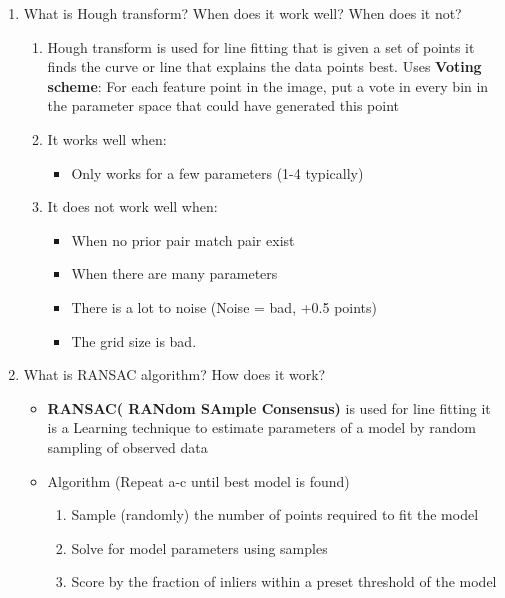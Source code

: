 \documentclass[12pt,letterpaper]{article}
\begin{document}
\begin{enumerate}
\begin{enumerate}
    \end{enumerate}
    \color{black}
    \item What is Hough transform? When does it work well? When does it not?\\
    \color{red}
    \begin{enumerate}
        \item Hough transform is used for line fitting that is given a set of points it finds the curve or line that explains the data points best. Uses \textbf{Voting scheme}: For each feature point in the image, put a vote in every bin in the parameter space that could have generated this point
        \item It works well when: 
        \begin{itemize}
            \item Only works for a few parameters (1-4 typically)
        \end{itemize}
        \item It does not work well when: 
        \begin{itemize}
            \item When no prior pair match pair exist
            \item When there are many parameters
            \item There is a lot to noise (Noise = bad, +0.5 points)
            \item The grid size is bad. 
        \end{itemize}
    \end{enumerate}
    \color{black}
    \item What is RANSAC algorithm? How does it work?\\
    \color{red}
    \begin{itemize}
        \item \textbf{RANSAC( RANdom SAmple Consensus)} is used for line fitting it is a Learning technique to estimate
parameters of a model by random
sampling of observed data
        \item Algorithm (Repeat a-c until best model is found)
        \begin{enumerate}
            \item Sample (randomly) the number of points required to fit the model
            \item Solve for model parameters using samples
            \item Score by the fraction of inliers within a preset threshold of the model
        \end{enumerate}

\end{itemize}
\end{enumerate}
\end{document}
